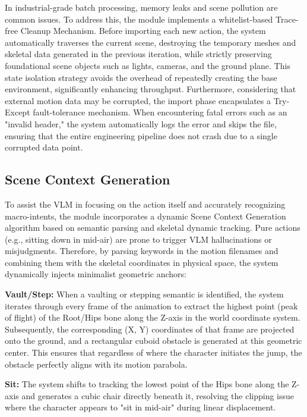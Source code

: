 \documentclass[11pt,oneside]{report}
\begin{document}
In industrial-grade batch processing, memory leaks and scene pollution are common issues. To address this, the module implements a whitelist-based Trace-free Cleanup Mechanism. Before importing each new action, the system automatically traverses the current scene, destroying the temporary meshes and skeletal data generated in the previous iteration, while strictly preserving foundational scene objects such as lights, cameras, and the ground plane. This state isolation strategy avoids the overhead of repeatedly creating the base environment, significantly enhancing throughput. Furthermore, considering that external motion data may be corrupted, the import phase encapsulates a Try-Except fault-tolerance mechanism. When encountering fatal errors such as an "invalid header," the system automatically logs the error and skips the file, ensuring that the entire engineering pipeline does not crash due to a single corrupted data point.

\subsection{Scene Context Generation}
To assist the VLM in focusing on the action itself and accurately recognizing macro-intents, the module incorporates a dynamic Scene Context Generation algorithm based on semantic parsing and skeletal dynamic tracking. Pure actions (e.g., sitting down in mid-air) are prone to trigger VLM hallucinations or misjudgments. Therefore, by parsing keywords in the motion filenames and combining them with the skeletal coordinates in physical space, the system dynamically injects minimalist geometric anchors:

\textbf{Vault/Step:} When a vaulting or stepping semantic is identified, the system iterates through every frame of the animation to extract the highest point (peak of flight) of the Root/Hips bone along the Z-axis in the world coordinate system. Subsequently, the corresponding (X, Y) coordinates of that frame are projected onto the ground, and a rectangular cuboid obstacle is generated at this geometric center. This ensures that regardless of where the character initiates the jump, the obstacle perfectly aligns with its motion parabola.

\textbf{Sit:} The system shifts to tracking the lowest point of the Hips bone along the Z-axis and generates a cubic chair directly beneath it, resolving the clipping issue where the character appears to "sit in mid-air" during linear displacement.
\end{document}
